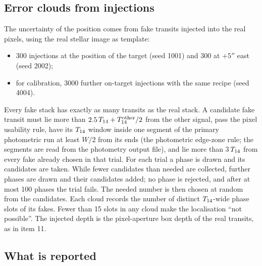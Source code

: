 \subsection{Error clouds from injections} \label{app:clouds}

The uncertainty of the position comes from fake transits injected into the real pixels, using the real stellar image
as template:
\begin{itemize}
\item 300 injections at the position of the target (seed 1001) and 300 at $+5''$ east (seed 2002);
\item for calibration, 3000 further on-target injections with the same recipe (seed 4004).
\end{itemize}
Every fake stack has exactly as many transits as the real stack. A candidate fake transit must lie more than
$2.5\,T_{14} + T_{14}^{\rm other}/2$ from the other signal, pass the pixel usability rule, have its $T_{14}$
window inside one segment of the primary photometric run at least $W/2$ from its ends (the photometric edge-zone rule;
the segments are read from the photometry output file), and lie more than 3\,$T_{14}$ from every fake already chosen
in that trial. For each trial a phase is drawn and its candidates are taken. While fewer candidates than needed are
collected, further phases are drawn and their candidates added; no phase is rejected, and after at most 100 phases the
trial fails. The needed number is then chosen at random from the candidates. Each cloud records the number of distinct
$T_{14}$-wide phase slots of its fakes. Fewer than 15 slots in any cloud make the localisation ``not possible''.
The injected depth is the pixel-aperture box depth of the real transits, as in item 11.

\subsection{What is reported}

